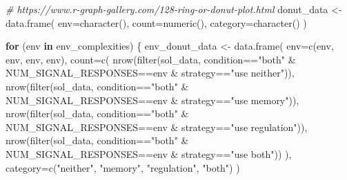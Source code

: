 \documentclass[
]{book}
\newenvironment{Shaded}{\begin{snugshade}}{\end{snugshade}}
\newcommand{\AttributeTok}[1]{\textcolor[rgb]{0.77,0.63,0.00}{#1}}
\newcommand{\CommentTok}[1]{\textcolor[rgb]{0.56,0.35,0.01}{\textit{#1}}}
\newcommand{\ControlFlowTok}[1]{\textcolor[rgb]{0.13,0.29,0.53}{\textbf{#1}}}
\newcommand{\FunctionTok}[1]{\textcolor[rgb]{0.00,0.00,0.00}{#1}}
\newcommand{\NormalTok}[1]{#1}
\newcommand{\OtherTok}[1]{\textcolor[rgb]{0.56,0.35,0.01}{#1}}
\newcommand{\SpecialCharTok}[1]{\textcolor[rgb]{0.00,0.00,0.00}{#1}}
\newcommand{\StringTok}[1]{\textcolor[rgb]{0.31,0.60,0.02}{#1}}
\begin{document}
\begin{Shaded}
\begin{Highlighting}[]
\CommentTok{\# https://www.r{-}graph{-}gallery.com/128{-}ring{-}or{-}donut{-}plot.html}
\NormalTok{donut\_data }\OtherTok{\textless{}{-}} \FunctionTok{data.frame}\NormalTok{(}
  \AttributeTok{env=}\FunctionTok{character}\NormalTok{(),}
  \AttributeTok{count=}\FunctionTok{numeric}\NormalTok{(),}
  \AttributeTok{category=}\FunctionTok{character}\NormalTok{()}
\NormalTok{)}

\ControlFlowTok{for}\NormalTok{ (env }\ControlFlowTok{in}\NormalTok{ env\_complexities) \{}
\NormalTok{  env\_donut\_data  }\OtherTok{\textless{}{-}} \FunctionTok{data.frame}\NormalTok{(}
    \AttributeTok{env=}\FunctionTok{c}\NormalTok{(env, env, env, env),}
    \AttributeTok{count=}\FunctionTok{c}\NormalTok{(}
      \FunctionTok{nrow}\NormalTok{(}\FunctionTok{filter}\NormalTok{(sol\_data, condition}\SpecialCharTok{==}\StringTok{"both"} \SpecialCharTok{\&}\NormalTok{ NUM\_SIGNAL\_RESPONSES}\SpecialCharTok{==}\NormalTok{env }\SpecialCharTok{\&}\NormalTok{ strategy}\SpecialCharTok{==}\StringTok{"use neither"}\NormalTok{)),}
      \FunctionTok{nrow}\NormalTok{(}\FunctionTok{filter}\NormalTok{(sol\_data, condition}\SpecialCharTok{==}\StringTok{"both"} \SpecialCharTok{\&}\NormalTok{ NUM\_SIGNAL\_RESPONSES}\SpecialCharTok{==}\NormalTok{env }\SpecialCharTok{\&}\NormalTok{ strategy}\SpecialCharTok{==}\StringTok{"use memory"}\NormalTok{)),}
      \FunctionTok{nrow}\NormalTok{(}\FunctionTok{filter}\NormalTok{(sol\_data, condition}\SpecialCharTok{==}\StringTok{"both"} \SpecialCharTok{\&}\NormalTok{ NUM\_SIGNAL\_RESPONSES}\SpecialCharTok{==}\NormalTok{env }\SpecialCharTok{\&}\NormalTok{ strategy}\SpecialCharTok{==}\StringTok{"use regulation"}\NormalTok{)),}
      \FunctionTok{nrow}\NormalTok{(}\FunctionTok{filter}\NormalTok{(sol\_data, condition}\SpecialCharTok{==}\StringTok{"both"} \SpecialCharTok{\&}\NormalTok{ NUM\_SIGNAL\_RESPONSES}\SpecialCharTok{==}\NormalTok{env }\SpecialCharTok{\&}\NormalTok{ strategy}\SpecialCharTok{==}\StringTok{"use both"}\NormalTok{))}
\NormalTok{    ),}
    \AttributeTok{category=}\FunctionTok{c}\NormalTok{(}\StringTok{"neither"}\NormalTok{, }\StringTok{"memory"}\NormalTok{, }\StringTok{"regulation"}\NormalTok{, }\StringTok{"both"}\NormalTok{)}
\NormalTok{  )}


\end{Highlighting}
\end{Shaded}
\end{document}
